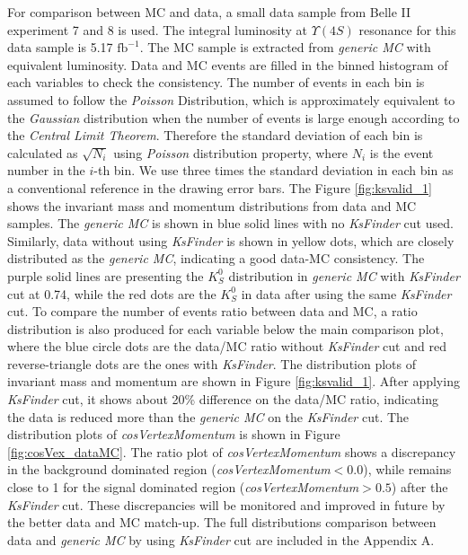 For comparison between MC and data, a small data sample from Belle II experiment 7 and 8 is used. The integral luminosity at $\Upsilon(4S)$ resonance for this data sample is 5.17 $\text{fb}^{-1}$. The MC sample is extracted from \textit{generic MC} with equivalent luminosity. Data and MC events are filled in the binned histogram of each variables to check the consistency. 
The number of events in each bin is assumed to follow the \textit{Poisson} Distribution, which is approximately equivalent to the \textit{Gaussian} distribution when the number of events is large enough according to the \textit{Central Limit Theorem}. Therefore the standard deviation of each bin is calculated as $\sqrt{N_i}$ using \textit{Poisson} distribution property, where $N_i$ is the event number in the $i$-th bin. We use three times the standard deviation in each bin as a conventional reference in the drawing error bars. The Figure \ref{fig:ksvalid_1} shows the invariant mass and momentum distributions from data and MC samples. The \textit{generic MC} is shown in blue solid lines with no \textit{KsFinder} cut used. Similarly, data without using \textit{KsFinder} is shown in yellow dots, which are closely distributed as the \textit{generic MC}, indicating a good data-MC consistency. The purple solid lines are presenting the $K_S^0$ distribution in \textit{generic MC} with \textit{KsFinder} cut at 0.74, while the red dots are the $K_S^0$ in data after using the same \textit{KsFinder} cut. To compare the number of events ratio between data and MC, a ratio distribution is also produced for each variable below the main comparison plot, where the blue circle dots are the data/MC ratio without \textit{KsFinder} cut and red reverse-triangle dots are the ones with \textit{KsFinder}. The distribution plots of invariant mass and momentum are shown in Figure \ref{fig:ksvalid_1}.
 After applying \textit{KsFinder} cut, it shows about 20\% difference on the data/MC ratio, indicating the data is reduced more than the \textit{generic MC} on the \textit{KsFinder} cut. The distribution plots of \textit{cosVertexMomentum} is shown in Figure \ref{fig:cosVex_dataMC}. The ratio plot of \textit{cosVertexMomentum}  shows a discrepancy in the background dominated region (\textit{cosVertexMomentum}$<0.0$), while remains close to 1 for the signal dominated region (\textit{cosVertexMomentum}$>0.5$) after the \textit{KsFinder} cut. 
These discrepancies will be monitored and improved in future by the better data and MC match-up.  The full distributions comparison between data and \textit{generic MC} by using  \textit{KsFinder} cut are included in the Appendix A.  

